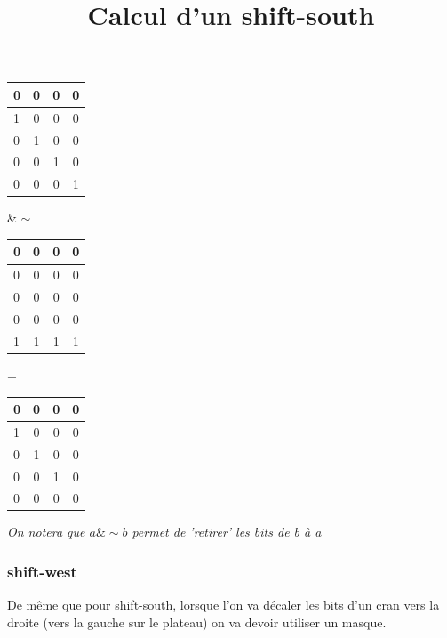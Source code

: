 \documentclass{report}
\begin{document}
\begin{center}
\renewcommand{\arraystretch} {1.5}
    \begin{tabular}{|p{0.2cm}|c|c|c|}
        \hline
        0 & 0 & 0 & 0\\
        \hline
        1 & 0 & 0 & 0 \\
        \hline
        0 & 1 & 0 & 0 \\
        \hline
        0 & 0 & 1 & 0 \\
        \hline
        0 & 0 & 0 & 1 \\
    \end{tabular}
    \& $\sim$
    \begin{tabular}{|p{0.2cm}|c|c|c|}
        \hline
        0 & 0 & 0 & 0\\
        \hline
        0 & 0 & 0 & 0 \\
        \hline
        0 & 0 & 0 & 0 \\
        \hline
        0 & 0 & 0 & 0 \\
        \hline
        1 & 1 & 1 & 1 \\
    \end{tabular}
    =
     \begin{tabular}{|p{0.2cm}|c|c|c|}
        \hline
        0 & 0 & 0 & 0\\
        \hline
        1 & 0 & 0 & 0 \\
        \hline
        0 & 1 & 0 & 0 \\
        \hline
        0 & 0 & 1 & 0 \\
        \hline
        0 & 0 & 0 & 0 \\
    \end{tabular}

\end{center}
\begin{center}
        \title{Calcul d'un shift-south}
\end{center}

\textit{On notera que $a \& \sim b$ permet de 'retirer' les bits de b à a}

\subsubsection{shift-west}

De même que pour shift-south, lorsque l'on va décaler les bits d'un cran vers la droite (vers la gauche sur le plateau) on va devoir utiliser un masque.
\end{document}
